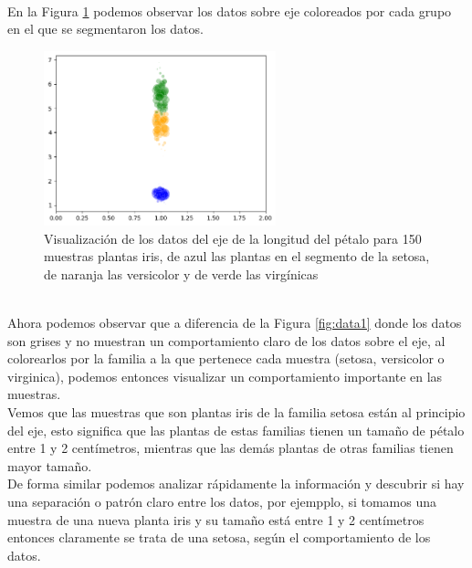 \documentclass{article}
\begin{document}
\hfill\hfill\\
En la Figura \ref{fig:box1} podemos observar los datos sobre eje coloreados por cada grupo en el que se segmentaron los datos.
\begin{figure}[h]
    \centering
    \includegraphics[width=0.6\textwidth]{figures/box1.png}
    \captionsetup{width=0.8\textwidth}
    \caption{Visualización de los datos del eje de la longitud del pétalo para 150 muestras plantas iris, de azul las plantas en el segmento de la setosa, de naranja las versicolor y de verde las virgínicas}
    \label{fig:box1}
\end{figure}
\\
Ahora podemos observar que a diferencia de la Figura \ref{fig:data1} donde los datos son grises y no muestran un comportamiento claro de los datos sobre el eje, al colorearlos por la familia a la que pertenece cada muestra (setosa, versicolor o virginica), podemos entonces visualizar un comportamiento importante en las muestras.
\\[12pt]
Vemos que las muestras que son plantas iris de la familia setosa están al principio del eje, esto significa que las plantas de estas familias tienen un tamaño de pétalo entre 1 y 2 centímetros, mientras que las demás plantas de otras familias tienen mayor tamaño.
\\[12pt]
De forma similar podemos analizar rápidamente la información y descubrir si hay una separación o patrón claro entre los datos, por ejempplo, si tomamos una muestra de una nueva planta iris y su tamaño está entre 1 y 2 centímetros entonces claramente se trata de una setosa, según el comportamiento de los datos.

\clearpage
\end{document}
